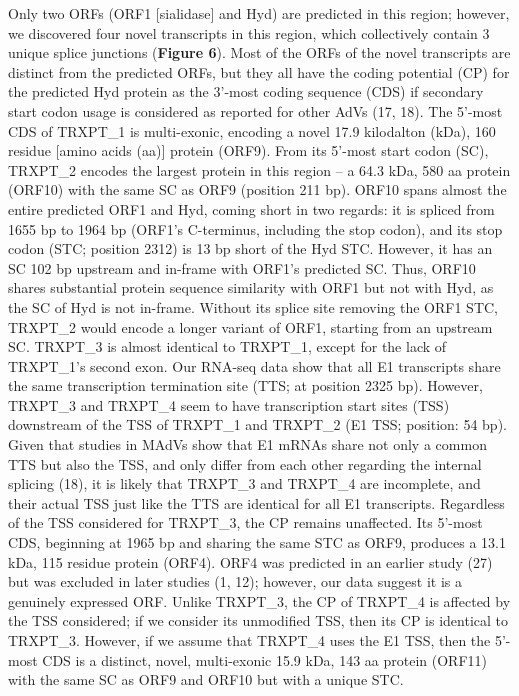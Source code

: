 \documentclass[
]{article}
\begin{document}
Only two ORFs (ORF1 {[}sialidase{]} and Hyd) are predicted in this
region; however, we discovered four novel transcripts in this region,
which collectively contain 3 unique splice junctions (\textbf{Figure
6}). Most of the ORFs of the novel transcripts are distinct from the
predicted ORFs, but they all have the coding potential (CP) for the
predicted Hyd protein as the 3'-most coding sequence (CDS) if secondary
start codon usage is considered as reported for other AdVs (17, 18). The
5'-most CDS of TRXPT\_1 is multi-exonic, encoding a novel 17.9
kilodalton (kDa), 160 residue {[}amino acids (aa){]} protein (ORF9).
From its 5'-most start codon (SC), TRXPT\_2 encodes the largest protein
in this region -- a 64.3 kDa, 580 aa protein (ORF10) with the same SC as
ORF9 (position 211 bp). ORF10 spans almost the entire predicted ORF1 and
Hyd, coming short in two regards: it is spliced from 1655 bp to 1964 bp
(ORF1's C-terminus, including the stop codon), and its stop codon (STC;
position 2312) is 13 bp short of the Hyd STC. However, it has an SC 102
bp upstream and in-frame with ORF1's predicted SC. Thus, ORF10 shares
substantial protein sequence similarity with ORF1 but not with Hyd, as
the SC of Hyd is not in-frame. Without its splice site removing the ORF1
STC, TRXPT\_2 would encode a longer variant of ORF1, starting from an
upstream SC. TRXPT\_3 is almost identical to TRXPT\_1, except for the
lack of TRXPT\_1's second exon. Our RNA-seq data show that all E1
transcripts share the same transcription termination site (TTS; at
position 2325 bp). However, TRXPT\_3 and TRXPT\_4 seem to have
transcription start sites (TSS) downstream of the TSS of TRXPT\_1 and
TRXPT\_2 (E1 TSS; position: 54 bp). Given that studies in MAdVs show
that E1 mRNAs share not only a common TTS but also the TSS, and only
differ from each other regarding the internal splicing (18), it is
likely that TRXPT\_3 and TRXPT\_4 are incomplete, and their actual TSS
just like the TTS are identical for all E1 transcripts. Regardless of
the TSS considered for TRXPT\_3, the CP remains unaffected. Its 5'-most
CDS, beginning at 1965 bp and sharing the same STC as ORF9, produces a
13.1 kDa, 115 residue protein (ORF4). ORF4 was predicted in an earlier
study (27) but was excluded in later studies (1, 12); however, our data
suggest it is a genuinely expressed ORF. Unlike TRXPT\_3, the CP of
TRXPT\_4 is affected by the TSS considered; if we consider its
unmodified TSS, then its CP is identical to TRXPT\_3. However, if we
assume that TRXPT\_4 uses the E1 TSS, then the 5'-most CDS is a
distinct, novel, multi-exonic 15.9 kDa, 143 aa protein (ORF11) with the
same SC as ORF9 and ORF10 but with a unique STC.
\end{document}
